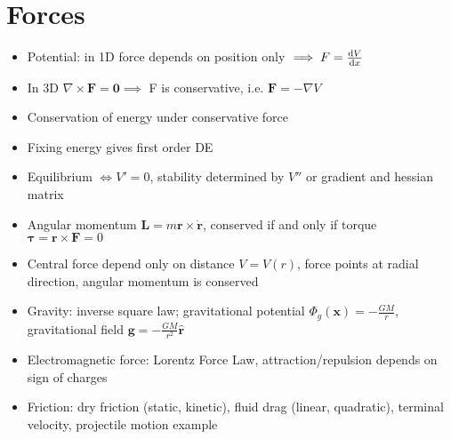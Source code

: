 \section{Forces}
\begin{itemize}
    \item Potential: in 1D force depends on position only $\implies F = \frac{\mathrm{d}{V}}{\mathrm{d}{x}}$
    \item In 3D $\nabla \times \mathbf{F} = \mathbf{0} \implies $ F is conservative, i.e. $ \mathbf{F} = -\nabla V$
    \item Conservation of energy under conservative force
    \item Fixing energy gives first order DE
    \item Equilibrium $\iff V' = 0$, stability determined by $V''$ or gradient and hessian matrix
    \item Angular momentum $\mathbf{L} = m \mathbf{r} \times \mathbf{\dot{r}} $, conserved if and only if torque $\mathbf{\tau} = \mathbf{r} \times \mathbf{F} = 0$
    \item Central force depend only on distance $V = V(r)$, force points at radial direction, angular momentum is conserved
    \item Gravity: inverse square law; gravitational potential $\Phi_g(\mathbf{x}) = -\frac{GM}{r}$, gravitational field $\mathbf{g} = -\frac{GM}{r^2} \mathbf{\hat{r}}$
    \item Electromagnetic force: Lorentz Force Law, attraction/repulsion depends on sign of charges
    \item Friction: dry friction (static, kinetic), fluid drag (linear, quadratic), terminal velocity, projectile motion example
\end{itemize}

